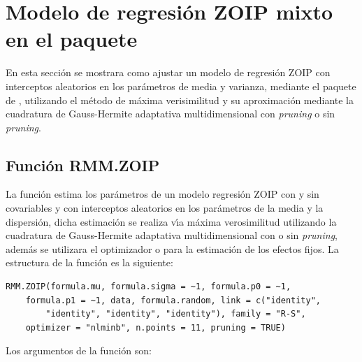 \section{Modelo de regresi\'{o}n ZOIP mixto en el paquete }

En esta secci\'{o}n se mostrara como ajustar un modelo de regresi\'{o}n ZOIP con interceptos aleatorios en los par\'{a}metros de media y varianza, mediante el paquete  de , utilizando el m\'{e}todo de m\'{a}xima verisimilitud y su aproximaci\'{o}n mediante la cuadratura de Gauss-Hermite adaptativa multidimensional con \textit{pruning} o sin \textit{pruning}.

\subsection{Funci\'{o}n RMM.ZOIP} 

La funci\'{o}n  estima los par\'{a}metros de un modelo regresi\'{o}n ZOIP con y sin covariables y con interceptos aleatorios en los par\'{a}metros de la media y la dispersi\'{o}n, dicha estimaci\'{o}n se realiza v\'{\i}a m\'{a}xima verosimilitud utilizando la cuadratura de Gauss-Hermite adaptativa multidimensional con o sin \textit{pruning}, adem\'{a}s se utilizara el optimizador  o  para la estimaci\'{o}n de los efectos fijos. La estructura de la funci\'{o}n  es la siguiente:

\begin{verbatim}
RMM.ZOIP(formula.mu, formula.sigma = ~1, formula.p0 = ~1, 
    formula.p1 = ~1, data, formula.random, link = c("identity", 
        "identity", "identity", "identity"), family = "R-S", 
    optimizer = "nlminb", n.points = 11, pruning = TRUE)
\end{verbatim}

Los argumentos de la funci\'{o}n  son:


